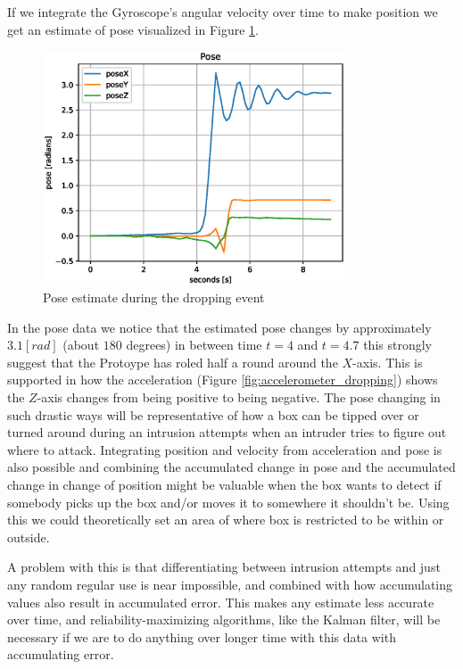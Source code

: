 \documentclass[../main.tex]{subfiles}
\begin{document}
If we integrate the Gyroscope's angular velocity over time to make position we get an estimate of pose visualized in Figure \ref{fig:pose_dropping}.


\begin{figure}[htbp]
    \centering
    \includegraphics[width=0.8\textwidth]{resources/figures/Pose_drop.eps}
    \caption{Pose estimate during the dropping event}
    \label{fig:pose_dropping}
\end{figure}

In the pose data we notice that the estimated pose changes by approximately $3.1 [rad]$ (about $180$ degrees) in between time $t=4$ and $t=4.7$ this strongly suggest that the Protoype has roled half a round around the $X$-axis. This is supported in how the acceleration (Figure \ref{fig:accelerometer_dropping}) shows the $Z$-axis changes from being positive to being negative.
The pose changing in such drastic ways will be representative of how a box can be tipped over or turned around during an intrusion attempts when an intruder tries to figure out where to attack. Integrating position and velocity from acceleration and pose is also possible and combining the accumulated change in pose and the accumulated change in change of position might be valuable when the box wants to detect if somebody picks up the box and/or moves it to somewhere it shouldn't be. Using this we could theoretically set an area of where box is restricted to be within or outside.

A problem with this is that differentiating between intrusion attempts and just any random regular use is near impossible, and combined with how accumulating values also result in accumulated error. This makes any estimate less accurate over time, and reliability-maximizing algorithms, like the Kalman filter, will be necessary if we are to do anything over longer time with this data with accumulating error.
\end{document}
